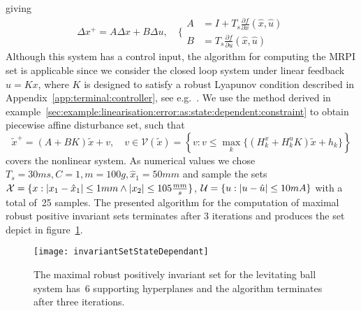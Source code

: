 giving
%
\[
\Delta x^+ = A \Delta x + B \Delta u , \quad
\Biggl\{\begin{aligned} A &= I+T_s\frac{\partial f}{\partial  x}(\hat
  x,\hat u) \\
B &= T_s \frac{\partial f}{\partial u}(\hat x,\hat u)
\end{aligned}
\]
%
Although this system has a control input, the algorithm for computing the MRPI set is applicable since we consider 
the closed loop system under linear feedback  $u=Kx$, where $K$ is designed to satisfy a robust Lyapunov condition 
described in Appendix~\ref{app:terminal:controller}, see e.g.~\cite{Boyd:94}.
%
We use the method derived in example~\ref{sec:example:linearisation:error:as:state:dependent:constraint} to 
obtain piecewise affine disturbance set, such that
%
\begin{equation}
	\tilde x^+ = (A+ BK)\tilde x + v,\quad v\in\mathcal V(\tilde x) = \left\{v:v\leq\max_{k} 
	\{(H_k^x + H_k^u K) \tilde x+ h_k\}
	\right\}
\end{equation}
%
covers the nonlinear system.
%
As numerical values we chose $T_s=30ms, C=1, m=100g, \hat x_1 = 50mm$ and sample
the sets $\mathcal X=\{x:\left|x_1- \hat x_1\right|\leq 1mm\wedge \left|x_2\right|\leq 105\frac{mm}{s}\}$, 
$\mathcal U=\{u:\left| u-\hat u\right|\leq10mA\}$ with a total of~25 samples.
%
The presented algorithm for the computation of maximal robust positive invariant sets 
terminates after 3 iterations and produces the set depict in figure~\ref{fig:MRPI:set:levitating:ball}.
%
\begin{figure}
\centering
\texttt{[image: invariantSetStateDependant]}
\caption{The maximal robust positively invariant set for the levitating ball system
has~6 supporting hyperplanes and the algorithm terminates after three iterations.}
\label{fig:MRPI:set:levitating:ball}
\end{figure}
%
%
%
%
%
